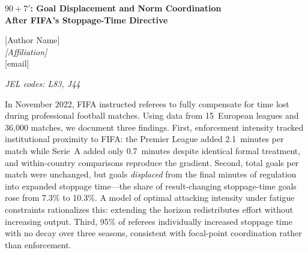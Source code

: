 \documentclass[12pt]{article}
\begin{document}
\thispagestyle{empty}

\begin{center}
{\large\textbf{$90{+}7'$: Goal Displacement and Norm Coordination\\
After FIFA's Stoppage-Time Directive}}

\bigskip

{[Author Name]}\\
\textit{[Affiliation]}\\
{[email]}

\bigskip

\textit{JEL codes: L83, J44}
\end{center}

\bigskip

\noindent
In November 2022, FIFA instructed referees to fully compensate for time
lost during professional football matches. Using data from 15~European
leagues and 36,000 matches, we document three findings. First, enforcement intensity tracked institutional proximity to
FIFA: the Premier League added 2.1~minutes per match while Serie~A
added only 0.7~minutes despite identical formal treatment, and
within-country comparisons reproduce the gradient. Second, total goals per match were unchanged, but goals
\textit{displaced} from the final minutes of regulation into expanded
stoppage time---the share of result-changing stoppage-time goals rose
from 7.3\% to 10.3\%. A model of optimal attacking intensity under
fatigue constraints rationalizes this: extending the horizon
redistributes effort without increasing output. Third, 95\% of referees
individually increased stoppage time with no decay over three seasons,
consistent with focal-point coordination rather than enforcement.
\end{document}

